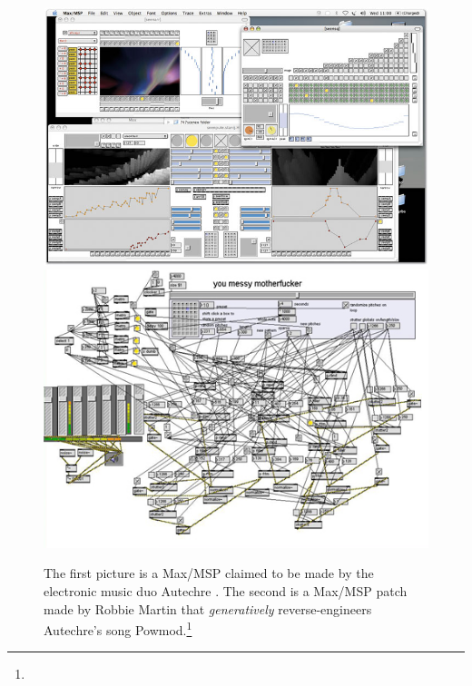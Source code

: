 \begin{figure}
    \centering
    \includegraphics[width=\textwidth]{pic/autechre-2.jpg}
    \includegraphics[width=\textwidth]{pic/autechre-1.jpg}
    \caption[Autechre related Max/MSP patches]{The first picture is a
      Max/MSP claimed to be made by the electronic music duo
      Autechre \cite{autechrepatch}. The second is a Max/MSP patch made
      by Robbie Martin that \emph{generatively} reverse-engineers
      Autechre's song Powmod.\footnote{}}
  \label{fig:autechre}
\end{figure}

